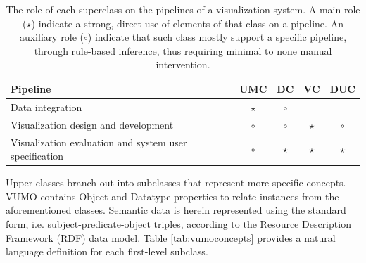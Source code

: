 \documentclass[]{interact}
\theoremstyle{plain}%
\theoremstyle{definition}
\theoremstyle{remark}
\theoremstyle{definition}
\begin{document}
\begin{small}
	\begin{table}[htb]
		\centering
		\caption{The role of each superclass on the pipelines of a visualization system. A main role ($\star$) indicate a strong, direct use of elements of that class on a pipeline. An auxiliary role ($\circ$) indicate that such class mostly support a specific pipeline, through rule-based inference, thus requiring minimal to none manual intervention.}
		\label{tbl:vumoroles}
		\begin{tabular}{lcccc}
			\toprule
			Pipeline & UMC & DC & VC & DUC \\ \midrule
			Data integration & $\star$ & $\circ$ &  &  \\
			Visualization design and development & $\circ$ & $\circ$ & $\star$ & $\circ$ \\
			Visualization evaluation and system user specification & $\circ$ & $\star$ & $\star$ & $\star$ \\ \bottomrule
		\end{tabular}
	\end{table}
\end{small}




Upper classes branch out into subclasses that represent more specific concepts. VUMO contains Object and Datatype properties to relate instances from the aforementioned classes. Semantic data is herein represented using the standard form, i.e. subject-predicate-object triples, according to the Resource Description Framework (RDF) data model. Table \ref{tab:vumoconcepts} provides a natural language definition for each first-level subclass.

\end{document}
